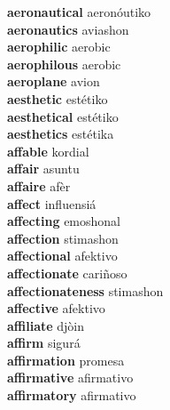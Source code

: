 \textbf{aeronautical } aeronóutiko \\
\textbf{aeronautics } aviashon \\
\textbf{aerophilic } aerobic \\
\textbf{aerophilous } aerobic \\
\textbf{aeroplane } avion \\
\textbf{aesthetic } estétiko \\
\textbf{aesthetical } estétiko \\
\textbf{aesthetics } estétika \\
\textbf{affable } kordial \\
\textbf{affair } asuntu \\
\textbf{affaire } afèr \\
\textbf{affect } influensiá \\
\textbf{affecting } emoshonal \\
\textbf{affection } stimashon \\
\textbf{affectional } afektivo \\
\textbf{affectionate } cariñoso \\
\textbf{affectionateness } stimashon \\
\textbf{affective } afektivo \\
\textbf{affiliate } djòin \\
\textbf{affirm } sigurá \\
\textbf{affirmation } promesa \\
\textbf{affirmative } afirmativo \\
\textbf{affirmatory } afirmativo \\
